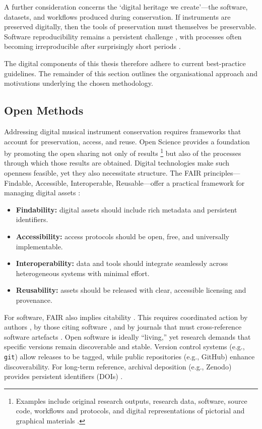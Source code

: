A further consideration concerns the `digital heritage we create'---the software,
datasets, and workflows produced during conservation. If instruments are
preserved digitally, then the tools of preservation must themselves be
preservable. Software reproducibility remains a persistent challenge
\cite{perkel_challenge_2020}, with processes often becoming irreproducible after
surprisingly short periods \cite{robert_reproducibility_2020}.

The digital components of this thesis therefore adhere to current best-practice
guidelines. The remainder of this section outlines the organisational approach
and motivations underlying the chosen methodology.


\subsection{Open Methods}\label{sec:open-methods}

Addressing digital musical instrument conservation requires frameworks that
account for preservation, access, and reuse. Open Science
\cite{unesco_open_2021} provides a foundation by promoting the open sharing not
only of results%
\footnote{Examples include original research outputs, research data, software,
source code, workflows and protocols, and digital representations of pictorial
and graphical materials \cite{unesco_open_2021}.} but also of the processes
through which those results are obtained. Digital technologies make such
openness feasible, yet they also necessitate structure. The FAIR
principles---Findable, Accessible, Interoperable, Reusable---offer a practical
framework for managing digital assets \cite{wilkinson_fair_2016}:

\begin{itemize}
	\item \textbf{Findability:} digital assets should include rich metadata and
	      persistent identifiers.
	\item \textbf{Accessibility:} access protocols should be open, free, and
	      universally implementable.
	\item \textbf{Interoperability:} data and tools should integrate seamlessly
	      across heterogeneous systems with minimal effort.
	\item \textbf{Reusability:} assets should be released with clear, accessible
	      licensing and provenance.
\end{itemize}

For software, FAIR also implies citability \cite{soito_citations_2016}. This
requires coordinated action by authors \cite{smith_software_2016}, by those
citing software \cite{katz_recognizing_2021}, and by journals that must
cross-reference software artefacts \cite{stall_journal_2023}. Open software is
ideally ``living,'' yet research demands that specific versions remain
discoverable and stable. Version control systems (e.g., \texttt{git}) allow
releases to be tagged, while public repositories (e.g., GitHub) enhance
discoverability. For long-term reference, archival deposition (e.g., Zenodo)
provides persistent identifiers (DOIs) \cite{smith_software_2016,
stall_journal_2023}.

